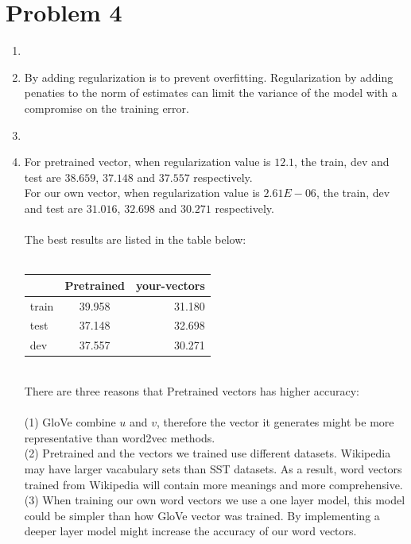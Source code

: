 \documentclass[10pt]{article}
\begin{document}
\begin{enumerate}[label=(\alph*)]
\end{enumerate}

\pagebreak[4]
\section*{Problem 4}
\begin{enumerate}[label=(\alph*)]
\item
\item
By adding regularization is to prevent overfitting.
Regularization by adding penaties to the norm of estimates can limit the variance of the model with a compromise on the training error.

\item


\item
For pretrained vector, when regularization value is $12.1$, the train, dev and test are $38.659$, $37.148$ and $37.557$ respectively.\\
For our own vector, when regularization value is $2.61E-06$, the train, dev and test are $31.016$, $32.698$ and $30.271$ respectively.\\
\\
The best results are listed in the table below:\\
\\
\begin{tabular}{ l | c | r }
\centering
        & Pretrained & your-vectors \\ \hline
  train & 39.958 & 31.180 \\ \hline
  test  & 37.148 & 32.698 \\ \hline
  dev   & 37.557 & 30.271 \\ \hline
\end{tabular}
\\
There are three reasons that Pretrained vectors has higher accuracy:\\
\\
(1) GloVe combine $u$ and $v$,
therefore the vector it generates might be more representative than word2vec methods.\\
(2) Pretrained and the vectors we trained use different datasets.
Wikipedia may have larger vacabulary sets than SST datasets.
As a result, word vectors trained from Wikipedia will contain more meanings and more comprehensive.\\
(3) When training our own word vectors we use a one layer model,
this model could be simpler than how GloVe vector was trained.
By implementing a deeper layer model might increase the accuracy of our word vectors.



\end{enumerate}
\end{document}
